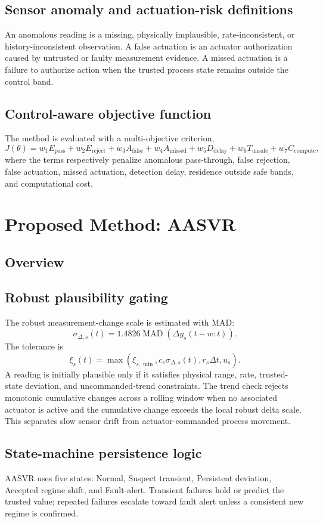 \documentclass[preprint,12pt]{elsarticle}
\begin{document}
\subsection{Sensor anomaly and actuation-risk definitions}
An anomalous reading is a missing, physically implausible, rate-inconsistent, or history-inconsistent observation. A false actuation is an actuator authorization caused by untrusted or faulty measurement evidence. A missed actuation is a failure to authorize action when the trusted process state remains outside the control band.

\subsection{Control-aware objective function}
The method is evaluated with a multi-objective criterion,
\[
J(\theta)=w_1E_{\mathrm{pass}}+w_2E_{\mathrm{reject}}+w_3A_{\mathrm{false}}+
w_4A_{\mathrm{missed}}+w_5D_{\mathrm{delay}}+w_6T_{\mathrm{unsafe}}+w_7C_{\mathrm{compute}},
\]
where the terms respectively penalize anomalous pass-through, false rejection, false actuation, missed actuation, detection delay, residence outside safe bands, and computational cost.

\section{Proposed Method: AASVR}
\subsection{Overview}
\subsection{Robust plausibility gating}
The robust measurement-change scale is estimated with MAD:
\[
\sigma_{\Delta,s}(t)=1.4826\operatorname{MAD}(\Delta y_s(t-w:t)).
\]
The tolerance is
\[
\xi_s(t)=\max(\xi_{s,\min}, c_s\sigma_{\Delta,s}(t), r_s\Delta t, u_s).
\]
A reading is initially plausible only if it satisfies physical range, rate, trusted-state deviation, and uncommanded-trend constraints. The trend check rejects monotonic cumulative changes across a rolling window when no associated actuator is active and the cumulative change exceeds the local robust delta scale. This separates slow sensor drift from actuator-commanded process movement.

\subsection{State-machine persistence logic}
AASVR uses five states: Normal, Suspect transient, Persistent deviation, Accepted regime shift, and Fault-alert. Transient failures hold or predict the trusted value; repeated failures escalate toward fault alert unless a consistent new regime is confirmed.
\end{document}
